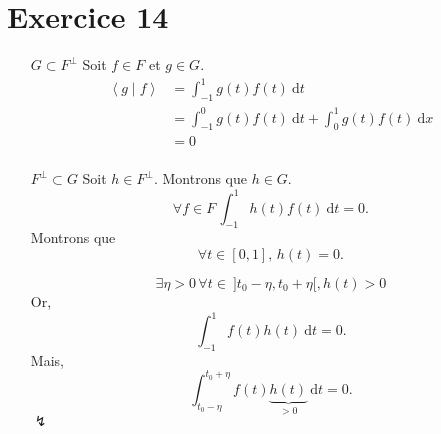 \part{Exercice 14}

\begin{itemize}
	\item[$G \subset F^\perp$ ] Soit $f \in F$ et $g \in G$.
		\begin{align*}
			\left<g \mid f \right> &= \int_{-1}^{1} g(t)f(t)~\mathrm{d}t \\
			&= \int_{-1}^{0} g(t) f(t)~\mathrm{d}t + \int_{0}^{1} g(t) f(t)~\mathrm{d}x \\
			&= 0 \\
		\end{align*}
	\item[$F^\perp \subset G$] Soit $h \in F^{\perp}$. Montrons que $h \in G$. \[
			\forall f \in F\,\int_{-1}^{1} h(t)f(t)~\mathrm{d}t = 0
		.\] Montrons que \[
			\forall t \in [0,1],\,h(t) = 0
		.\]

		\[
			\exists \eta > 0\,\forall t \in\:]t_0-\eta,t_0+\eta[,h(t) > 0
		\] Or, \[
			\int_{-1}^{1} f(t) h(t)~\mathrm{d}t = 0
		.\] Mais, \[
			\int_{t_0-\eta}^{t_0+\eta} f(t)\underbrace{h(t)}_{> 0}~\mathrm{d}t = 0
		.\] $\lightning$
\end{itemize}

